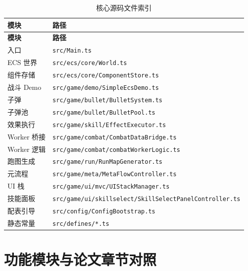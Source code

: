 \begin{longtable}{p{3.5cm}p{9cm}}
  \caption{核心源码文件索引} \label{tab:file-index} \\
  \toprule
  \textbf{模块} & \textbf{路径} \\
  \midrule
  \endfirsthead
  \toprule
  \textbf{模块} & \textbf{路径} \\
  \midrule
  \endhead
  入口 & \texttt{src/Main.ts} \\
  ECS 世界 & \texttt{src/ecs/core/World.ts} \\
  组件存储 & \texttt{src/ecs/core/ComponentStore.ts} \\
  战斗 Demo & \texttt{src/game/demo/SimpleEcsDemo.ts} \\
  子弹 & \texttt{src/game/bullet/BulletSystem.ts} \\
  子弹池 & \texttt{src/game/bullet/BulletPool.ts} \\
  效果执行 & \texttt{src/game/skill/EffectExecutor.ts} \\
  Worker 桥接 & \texttt{src/game/combat/CombatDataBridge.ts} \\
  Worker 逻辑 & \texttt{src/game/combat/combatWorkerLogic.ts} \\
  跑图生成 & \texttt{src/game/run/RunMapGenerator.ts} \\
  元流程 & \texttt{src/game/meta/MetaFlowController.ts} \\
  UI 栈 & \texttt{src/game/ui/mvc/UIStackManager.ts} \\
  技能面板 & \texttt{src/game/ui/skillselect/SkillSelectPanelController.ts} \\
  配表引导 & \texttt{src/config/ConfigBootstrap.ts} \\
  静态常量 & \texttt{src/defines/*.ts} \\
  \bottomrule
\end{longtable}

\section{功能模块与论文章节对照}
\label{sec:module-map}

